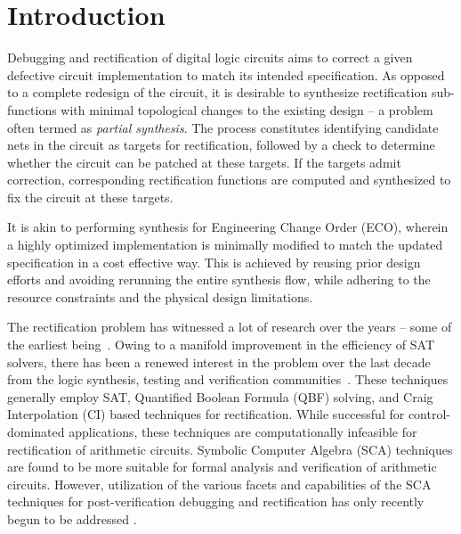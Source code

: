 \section{Introduction}
\par Debugging and rectification of digital logic circuits aims to correct
a given defective circuit implementation to match its intended
specification. {\red As opposed to a complete redesign of the circuit, it
is desirable to synthesize rectification sub-functions with
minimal topological changes to the existing design -- a problem
often termed as {\it partial synthesis}.} 
The process constitutes identifying
candidate nets in the circuit as targets for rectification, followed by  
a check to determine whether the circuit can be patched at these
targets. 
If the targets admit correction, corresponding rectification
functions are computed and synthesized to fix the circuit at these targets.
{\red  
It is akin to performing synthesis for Engineering Change Order 
(ECO), wherein a highly optimized implementation is minimally modified to match the 
updated specification in a cost effective way. This is achieved by reusing prior design 
efforts and avoiding rerunning the entire synthesis flow, while adhering to the resource 
constraints and the physical design limitations.

The rectification problem has witnessed a lot of research over the years -- 
some of the earliest being~\cite{Sadowska:DAC95,scholl:1,andreas:2005}.
Owing to a manifold improvement in the efficiency of SAT solvers,
there has been a renewed interest in the problem over the last decade from 
the logic synthesis, testing and verification communities~\cite{
MF_Huang:DATE12,scholl:2,SS_Fujita:ISQED17,SS_Alan:DAC18}.
These techniques generally employ SAT, Quantified Boolean Formula (QBF) solving,
and Craig Interpolation (CI) based techniques for rectification. While
successful for control-dominated applications, these techniques are
computationally infeasible for rectification of arithmetic circuits.
Symbolic Computer Algebra (SCA) techniques are found to be more
suitable for formal analysis and verification of arithmetic circuits.
However, utilization of the various facets and capabilities of the SCA
techniques for post-verification debugging and rectification has only
recently begun to be addressed
\cite{farimah:2017:1,MF_Rolf:ISVLSI18,Utkarsh:VLSI18,
Vkrao:FMCAD18,Vkrao:ISQED21,Vkrao:GLSVLSI21}. }


